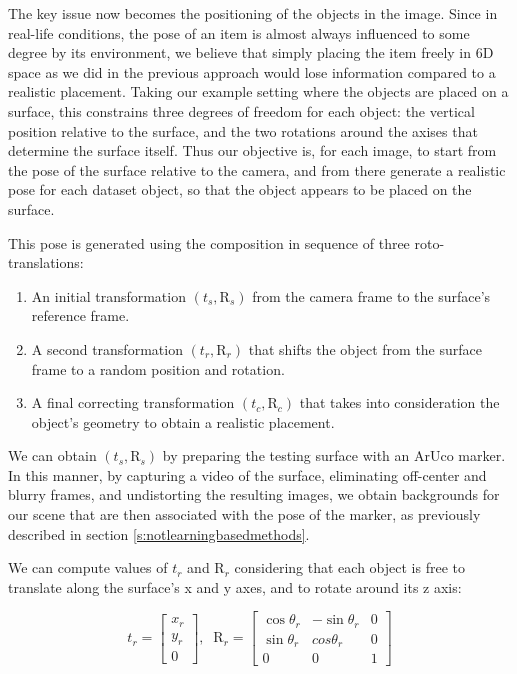 The key issue now becomes the positioning of the objects in the image. Since in real-life conditions, the pose of an item is almost always influenced to some degree by its environment, we believe that simply placing the item freely in 6D space as we did in the previous approach would lose information compared to a realistic placement. Taking our example setting where the objects are placed on a surface, this constrains three degrees of freedom for each object: the vertical position relative to the surface, and the two rotations around the axises that determine the surface itself. Thus our objective is, for each image, to start from the pose of the surface relative to the camera, and from there generate a realistic pose for each dataset object, so that the object appears to be placed on the surface.

This pose is generated using the composition in sequence of three roto-translations:

\begin{enumerate}
    \item An initial transformation $(t_s, \text{R}_s)$ from the camera frame to the surface's reference frame.
    \item A second transformation $(t_r, \text{R}_r)$ that shifts the object from the surface frame to a random position and rotation.
    \item A final correcting transformation $(t_c, \text{R}_c)$ that takes into consideration the object's geometry to obtain a realistic placement.
\end{enumerate}

We can obtain $(t_s, \text{R}_s)$ by preparing the testing surface with an ArUco marker. In this manner, by capturing a video of the surface, eliminating off-center and blurry frames, and undistorting the resulting images, we obtain backgrounds for our scene that are then associated with the pose of the marker, as previously described in section \ref*{s:notlearningbasedmethods}.

We can compute values of $t_r$ and $\text{R}_r$ considering that each object is free to translate along the surface's x and y axes, and to rotate around its z axis:

\begin{equation}
    t_r = 
    \begin{bmatrix}
        x_r\\y_r\\0
    \end{bmatrix}
    ,\; \; \text{R}_r =
    \begin{bmatrix}
        \cos \theta_r & - \sin \theta_r & 0 \\
        \sin \theta_r & cos \theta_r & 0 \\
        0 & 0 & 1
    \end{bmatrix}
    \label{eq:translationsurface}
\end{equation}

